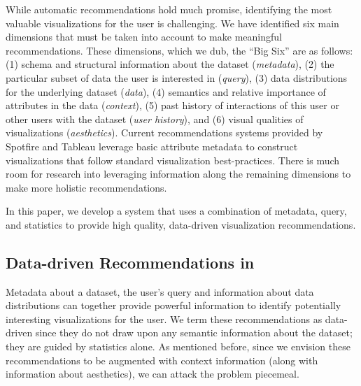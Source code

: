 While automatic recommendations hold much promise, identifying the most valuable visualizations for the user is 
challenging. 
We have identified six main dimensions that must be taken into account to make meaningful recommendations. 
These dimensions, which we dub, the ``Big Six'' are as follows:  
(1) schema and structural information about the dataset ({\it metadata}), 
(2) the particular subset of data the user is interested in ({\it query}), 
(3) data distributions for the underlying dataset ({\it data}), 
(4) semantics and relative importance of attributes in the data ({\it context}), 
(5) past history of interactions of this user or other users with the dataset ({\it user history}), 
and (6) visual qualities of visualizations ({\it aesthetics}). 
Current recommendations systems provided by Spotfire and Tableau leverage basic attribute metadata to construct
visualizations that follow standard visualization best-practices.
There is much room for research into leveraging information along the remaining dimensions to make more holistic
recommendations.


In this paper, we develop a system that uses a combination of metadata, query, and statistics to 
provide high quality, data-driven visualization recommendations.

\subsection*{Data-driven Recommendations in \SeeDB}

Metadata about a dataset, the user's query and information about data distributions can together provide powerful
information to identify potentially interesting visualizations for the user.
We term these recommendations as data-driven since they do not draw upon any semantic information about the dataset;
they are guided by statistics alone.
As mentioned before, since we envision these recommendations to be augmented with context information (along with
information about aesthetics), we can attack the problem piecemeal.

